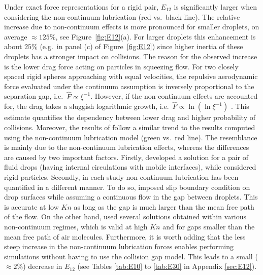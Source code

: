 \documentclass[../thesis.tex]{subfiles}
\begin{document}
Under exact force representations for a rigid pair, $E_{12}$ is significantly larger when considering the non-continuum lubrication (red vs.\ black line). The relative increase due to non-continuum effects is more pronounced for smaller droplets, on average $\approx125$\%, see Figure~\ref{fig:E12}(a). For larger droplets this enhancement is about $25$\% (e.g.\ in panel (c) of Figure~\ref{fig:E12}) since higher inertia of these droplets has a stronger impact on collisions. The reason for the observed increase is the lower drag force acting on particles in squeezing flow. For two closely spaced rigid spheres approaching with equal velocities, the repulsive aerodynamic force evaluated under the continuum assumption is inversely proportional to the separation gap, i.e.\ $\hat{F}\propto\xi^{-1}$. However, if the non-continuum effects are accounted for, the drag takes a sluggish logarithmic growth, i.e.\ $\hat{F}\propto\ln(\ln\xi^{-1})$ \citep{SK96,DRK21a}. This estimate quantifies the dependency between lower drag and higher probability of collisions. Moreover, the results of \cite{RSD22} follow a similar trend to the results computed using the non-continuum lubrication model (green vs.\ red line). The resemblance is mainly due to the non-continuum lubrication effects, whereas the differences are caused by two important factors. Firstly, \cite{RSD22} developed a solution for a pair of fluid drops (having internal circulations with mobile interfaces), while \cite{DRK21a} considered rigid particles. Secondly, in each study non-continuum lubrication has been quantified in a different manner. To do so, \cite{RSD22} imposed slip boundary condition on drop surfaces while assuming a continuous flow in the gap between droplets. This is accurate at low $Kn$ as long as the gap is much larger than the mean free path of the flow. On the other hand, \cite{DRK21a} used several solutions obtained within various non-continuum regimes, which is valid at high $Kn$ and for gaps smaller than the mean free path of air molecules. Furthermore, it is worth adding that the less steep increase in the non-continuum lubrication forces enables performing simulations without having to use the collision gap model. This leads to a small ($\approx2\%$) decrease in $E_{12}$ (see Tables \ref{tab:E10} to \ref{tab:E30} in Appendix \ref{sec:E12}).
\end{document}

